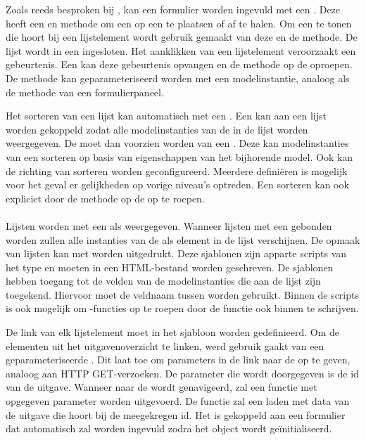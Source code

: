 Zoals reeds besproken bij , kan een formulier worden ingevuld met een .
Deze  heeft een  en  methode om een  op een  te plaatsen of af te halen.
Om een  te tonen die hoort bij een lijstelement wordt gebruik gemaakt van deze  en de  methode.
De lijst wordt in een  ingesloten.
Het aanklikken van een lijstelement veroorzaakt een  gebeurtenis.
Een  kan deze gebeurtenis opvangen en de  methode op de  oproepen.
De methode kan geparameteriseerd worden met een modelinstantie, analoog als de  methode van een formulierpaneel.

Het sorteren van een lijst kan automatisch met een .
Een  kan aan een lijst worden gekoppeld zodat alle modelinstanties van de  in de lijst worden weergegeven.
De  moet dan voorzien worden van een .
Deze kan modelinstanties van een  sorteren op basis van eigenschappen van het bijhorende model.
Ook kan de richting van sorteren worden geconfigureerd.
Meerdere  definiëren is mogelijk voor het geval er gelijkheden op vorige niveau's optreden.
Een  sorteren kan ook expliciet door de  methode op de  op te roepen.

\paragraph{\kendo}
Lijsten worden met een  als  weergegeven.
Wanneer lijsten met een  gebonden worden zullen alle instanties van de  als element in de lijst verschijnen.
De opmaak van lijsten kan met \kendo{}  worden uitgedrukt.
Deze sjablonen zijn apparte scripts van het type  en moeten in een HTML-bestand worden geschreven.
De sjablonen hebben toegang tot de velden van de modelinstanties die aan de lijst zijn toegekend.
Hiervoor moet de veldnaam tussen  worden gebruikt.
Binnen de scripts is ook mogelijk om \js-functies op te roepen door de functie ook binnen  te schrijven.

De link van elk lijstelement moet in het sjabloon worden gedefinieerd.
Om de elementen uit het uitgavenoverzicht te linken, werd gebruik gaakt van een geparameteriseerde .
Dit laat toe om parameters in de link naar de  op te geven,  analoog aan HTTP GET-verzoeken.
De parameter die wordt doorgegeven is de id van de uitgave.
Wanneer naar de  wordt genavigeerd, zal een functie met opgegeven parameter worden uitgevoerd.
De functie zal een  laden met data van de uitgave die hoort bij de meegekregen id.
Het  is gekoppeld aan een formulier dat automatisch zal worden ingevuld zodra het object wordt geïnitialiseerd.

